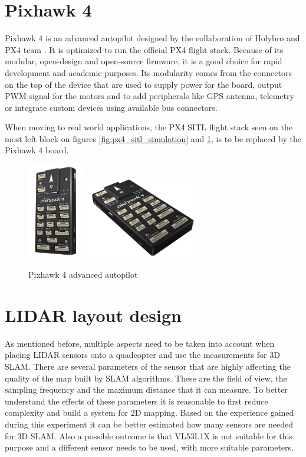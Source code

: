 \section{Pixhawk 4}
Pixhawk 4 is an advanced autopilot designed by the collaboration of Holybro and PX4 team \cite{Pixhawk4Website}. 
It is optimized to run the official PX4 flight stack. Because of its modular, open-design and open-source 
firmware, it is a good choice for rapid development and academic purposes. Its modularity comes from the 
connectors on the top of the device that are used to supply power for the board, output PWM signal for 
the motors and to add peripherals like GPS antenna, telemetry or integrate custom devices using available
bus connectors. 

When moving to real world applications, the PX4 SITL flight stack seen on the most left block on figures
\ref{fig:px4_sitl_simulation} and \ref{fig:px4_sitl_ros_wrapper}, is to be replaced by the Pixhawk 4 board.

\begin{figure}[h]
    \centering
    \includegraphics[width=25mm, keepaspectratio]{figures/pixhawk4.jpg}\hspace{0cm}
    \includegraphics[width=50mm, keepaspectratio]{figures/pixhawk4_2.jpg}
    \caption{Pixhawk 4 advanced autopilot}
    \label{fig:px4_sitl_ros_wrapper}
\end{figure}

\section{LIDAR layout design}
As mentioned before, multiple aspects need to be taken into account when placing LIDAR sensors onto a
quadcopter and use the measurements for 3D SLAM. There are several parameters of the sensor that are 
highly affecting the quality of the map built by SLAM algorithms. These are the field of view, the 
sampling frequency and the maximum distance that it can measure. To better understand the effects of
these parameters it is reasonable to first reduce complexity and build a system for 2D mapping. Based on 
the experience gained during this experiment it can be better estimated how many sensors are needed for
3D SLAM. Also a possible outcome is that VL53L1X is not suitable for this purpose and a different
sensor needs to be used, with more suitable parameters.

